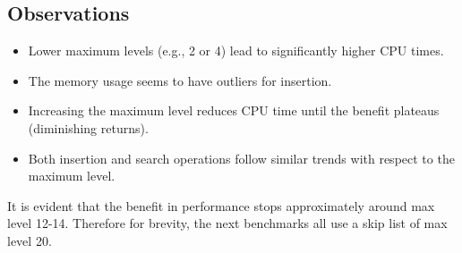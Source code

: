 \documentclass{article}
\begin{document}
\begin{minipage}{0.5\textwidth}
    \centering
    \label{tab:skiplist_maxlevel_search}
\end{minipage}


\subsection{Observations}
\begin{itemize}
    \item Lower maximum levels (e.g., 2 or 4) lead to significantly higher CPU times. 
    \item The memory usage seems to have outliers for insertion.
    \item Increasing the maximum level reduces CPU time until the benefit plateaus (diminishing returns).
    \item Both insertion and search operations follow similar trends with respect to the maximum level.
\end{itemize}
It is evident that the benefit in performance stops approximately around max level 12-14. Therefore for brevity, the next benchmarks all use a skip list of max level 20.
\end{document}
